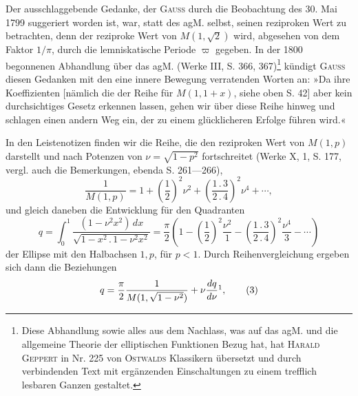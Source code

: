 Der ausschlaggebende Gedanke, der \textsc{Gauss} durch die Beobachtung des
30. Mai 1799 suggeriert worden ist, war, statt des agM. selbst, seinen
reziproken Wert zu betrachten, denn der reziproke Wert von \(M(1,\sqrt2)\) wird,
abgesehen von dem Faktor \(1/\pi\), durch die lemniskatische Periode \(\varpi\) gegeben.
In der 1800 begonnenen Abhandlung über das agM. (Werke III, S. 366,
367)\footnote{Diese Abhandlung sowie alles aus dem Nachlass, was auf das agM. und die allgemeine Theorie der elliptischen Funktionen Bezug hat, hat \textsc{Harald Geppert} in Nr. 225 von \textsc{Ostwalds} Klassikern übersetzt und durch verbindenden Text mit ergänzenden Einschaltungen zu einem trefflich lesbaren Ganzen gestaltet.} kündigt \textsc{Gauss} diesen Gedanken mit den eine innere Bewegung verratenden
Worten an: »Da ihre Koeffizienten [nämlich die der Reihe für
\(M(1,1+x)\), siehe oben S. 42] aber kein durchsichtiges Gesetz erkennen lassen,
gehen wir über diese Reihe hinweg und schlagen einen andern Weg ein, der
zu einem glücklicheren Erfolge führen wird.«\par
\clearpage{}
\indent In den Leistenotizen finden wir die Reihe, die den reziproken Wert von
\(M(1,p)\) darstellt und nach Potenzen von \(\nu=\sqrt{1-p^2}\) fortschreitet (Werke X, 1,
S. 177, vergl. auch die Bemerkungen, ebenda S. 261—266),
\begingroup\makeatletter\tagsleft@true\let\veqno\leqno\makeatother
\begin{equation*}
\frac1{M(1,p)}=1+\left(\frac12\right)^2\nu^2+\left(\frac{1\,.\,3}{2\,.\,4}\right)^2\nu^4+\cdots,\tag*{(1)}
\end{equation*}
\noindent und gleich daneben die Entwicklung für den Quadranten
\begin{equation*}
q=\int_0^1\frac{(1-\nu^2x^2)\,dx}{\sqrt{1-x^2\,.\,1-\nu^2x^2}}
=\frac\pi2\left(1-\left(\frac12\right)^2\frac{\nu^2}{1}-\left(\frac{1\,.\,3}{2\,.\,4}\right)^2\frac{\nu^4}{3}-\cdots\right)\tag*{(2)}
\end{equation*}
\noindent der Ellipse mit den Halbachsen \(1,p\), für \(p<1\). Durch Reihenvergleichung
ergeben sich dann die Beziehungen
\begin{equation*}
q=\frac\pi2\frac1{M(1,\sqrt{1-\nu^2})}+\nu\frac{dq}{d\nu}\hbox{\footnotemark},\tag*{(3)}
\end{equation*}
